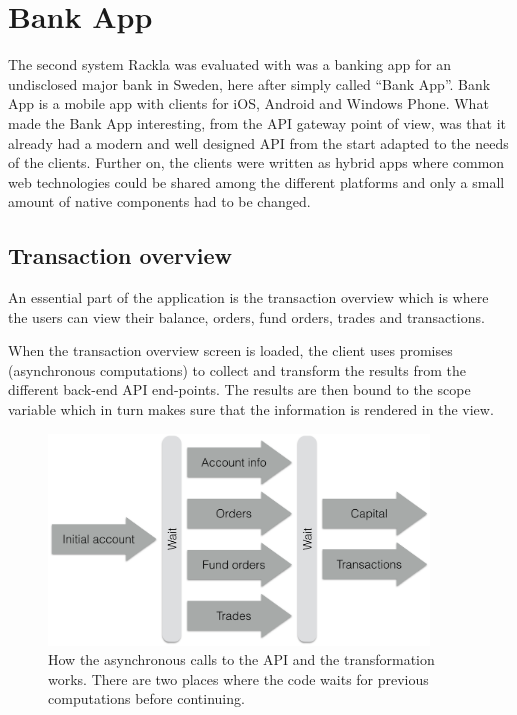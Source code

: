 \documentclass{cslthse-msc}
\begin{document}
\section{Bank App}
The second system Rackla was evaluated with was a banking app for an undisclosed major bank in Sweden, here after simply called \enquote{Bank App}. Bank App is a mobile app with clients for iOS, Android and Windows Phone. What made the Bank App interesting, from the API gateway point of view, was that it already had a modern and well designed API from the start adapted to the needs of the clients. Further on, the clients were written as hybrid apps where common web technologies could be shared among the different platforms and only a small amount of native components had to be changed.

\subsection{Transaction overview}
An essential part of the application is the transaction overview which is where the users can view their balance, orders, fund orders, trades and transactions.

When the transaction overview screen is loaded, the client uses promises (asynchronous computations) to collect and transform the results from the different back-end API end-points. The results are then bound to the scope variable which in turn makes sure that the information is rendered in the view.

\begin{figure}[H]
  \centering
    \begin{center}
      \includegraphics[width=0.9\textwidth]{images/bank_overview.png}
    \end{center}
  \caption{How the asynchronous calls to the API and the transformation works. There are two places where the code waits for previous computations before continuing.}
\end{figure}
\end{document}
